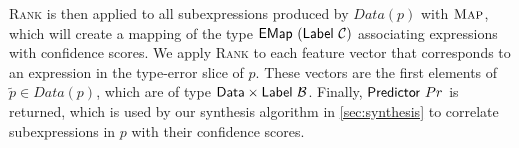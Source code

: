 \textsc{Rank} is then applied to all subexpressions produced by $Data(p)$ with
$\textsc{Map}$, which will create a mapping of the type
$\mathsf{EMap}\ (\mathsf{Label}\ \mathcal{C})$ associating expressions with confidence scores. We
apply \textsc{Rank} to each feature vector that corresponds to an expression in
the type-error slice of $p$. These vectors are the first elements of $\tilde{p}
\in Data(p)$, which are of type $\mathsf{Data} \times \mathsf{Label}\ \mathcal{B}$. Finally,
$\mathsf{Predictor}\ Pr$ is returned, which is used by our synthesis algorithm in
\autoref{sec:synthesis} to correlate subexpressions in $p$ with their confidence
scores.
